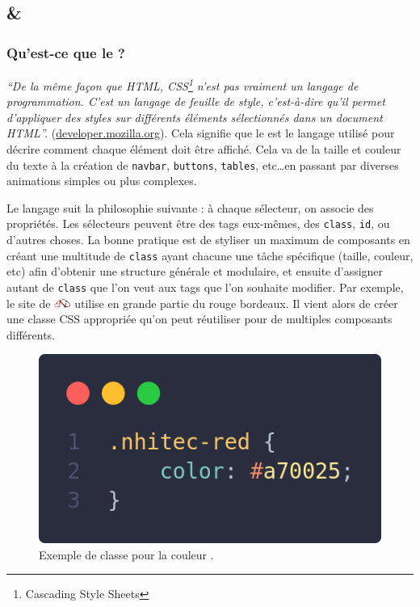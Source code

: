 \subsection[Tailwind et CSS]{\tailwind{} \& \css{}}
\subsubsection[Qu'est-ce que le CSS?][fr.wikipedia.org/wiki/Feuilles\_de\_style\_en\_cascade]{Qu'est-ce que le \css{}?}\label{sec:css} 
\textit{``De la même façon que HTML, CSS\footnote{Cascading Style Sheets} n'est pas vraiment un langage de programmation. C'est un langage de feuille de style, c'est-à-dire qu'il permet d'appliquer des styles sur différents éléments sélectionnés dans un document HTML''.} (\href{https://developer.mozilla.org/fr/docs/Learn/Getting_started_with_the_web/CSS_basics}{developer.mozilla.org}). Cela signifie que le \css{} est le langage utilisé pour décrire comment chaque élément \html{} doit être affiché. Cela va de la taille et couleur du texte à la création de \verb|navbar|, \verb|buttons|, \verb|tables|, etc\ldots en passant par diverses animations simples ou plus complexes.

Le langage suit la philosophie suivante : à chaque sélecteur, on associe des propriétés. Les sélecteurs peuvent être des tags \html{} eux-mêmes, des \verb|class|, \verb|id|, ou d'autres choses. La bonne pratique est de styliser un maximum de composants en créant une multitude de \verb|class| ayant chacune une tâche spécifique (taille, couleur, etc) afin d'obtenir une structure générale et modulaire, et ensuite d'assigner autant de \verb|class| que l'on veut aux tags \html{} que l'on souhaite modifier. Par exemple, le site de \href{https://nhitec.com}{\nhitec{} \!\includegraphics[height=8pt]{N-Hitec_images/Logo.pdf}} utilise en grande partie du rouge bordeaux. Il vient alors de créer une classe CSS appropriée qu'on peut réutiliser pour de multiples composants différents.

\begin{figure}[H]
    \centering
    \includegraphics[width=0.4\linewidth]{figures-C1/css_nhitec_example.png}
    \caption{Exemple de classe \css{} pour la couleur \nhitec{}.}
    \label{fig:css-nhitec}
\end{figure}

